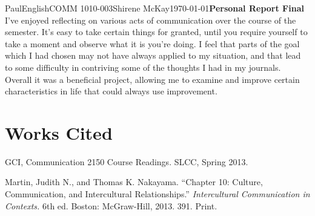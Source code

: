 \documentclass[12pt,letterpaper]{article}
\begin{document}
\begin{mla}{Paul}{English}{COMM 1010-003}{Shirene
    McKay}{\today}{\textbf{Personal Report Final}}
I've enjoyed reflecting on various acts of communication over the course of the semester. It's easy to take certain things for granted, until you require yourself to take a moment and observe what it is you're doing. I feel that parts of the goal which I had chosen may not have always applied to my situation, and that lead to some difficulty in contriving some of the thoughts I had in my journals. Overall it was a beneficial project, allowing me to examine and improve certain characteristics in life that could always use improvement.

\pagebreak
\section{Works Cited}

\bibent
GCI, Communication 2150 Course Readings. SLCC, Spring 2013.
\bibent

Martin, Judith N., and Thomas K. Nakayama. ``Chapter 10: Culture,
Communication, and Intercultural Relationships.''
\textit{Intercultural Communication in Contexts.} 6th ed. Boston: 
McGraw-Hill, 2013. 391. Print.


\end{mla}
\end{document}
